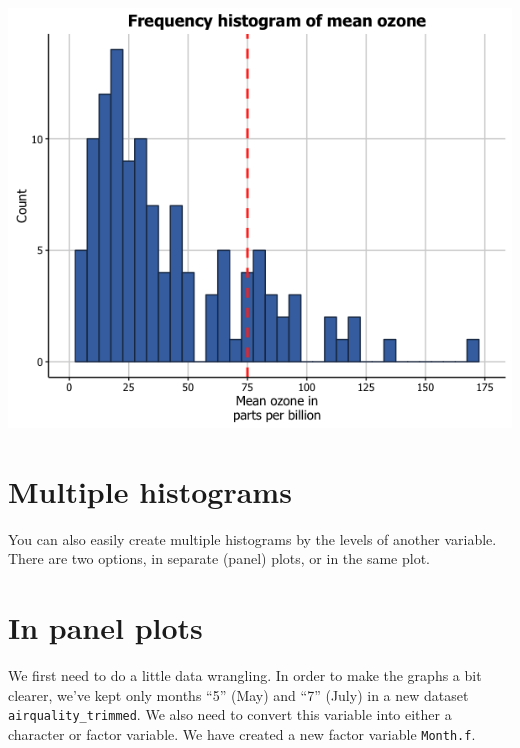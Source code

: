\begin{Shaded}
\begin{Highlighting}[]
\StringTok{        } \NormalTok{(), }
\StringTok{        } \NormalTok{(), } \NormalTok{(),}
\StringTok{        } \NormalTok{(} \NormalTok{, } \NormalTok{, } \NormalTok{),}
\StringTok{        }\NormalTok{(}\NormalTok{))}
\end{Highlighting}
\end{Shaded}

\begin{center}\includegraphics[width=0.55\linewidth]{0_all_posts_pdf/histogram_17-1} \end{center}

\section{Multiple histograms}\label{multiple-histograms}

You can also easily create multiple histograms by the levels of another
variable. There are two options, in separate (panel) plots, or in the
same plot.

\section{In panel plots}\label{in-panel-plots}

We first need to do a little data wrangling. In order to make the graphs
a bit clearer, we've kept only months ``5'' (May) and ``7'' (July) in a
new dataset \texttt{airquality\_trimmed}. We also need to convert this
variable into either a character or factor variable. We have created a
new factor variable \texttt{Month.f}.

